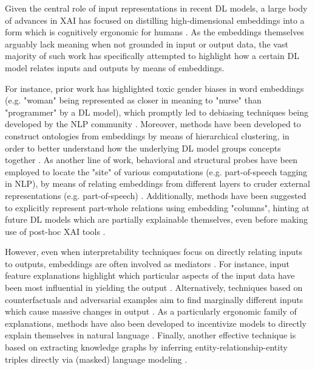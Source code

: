Given the central role of input representations in recent DL models, a large body of advances in XAI has focused on distilling high-dimensional embeddings into a form which is cognitively ergonomic for humans \citep{madsen_post-hoc_2021}. As the embeddings themselves arguably lack meaning when not grounded in input or output data, the vast majority of such work has specifically attempted to highlight how a certain DL model relates inputs and outputs by means of embeddings.

For instance, prior work has highlighted toxic gender biases in word embeddings (e.g. "woman" being represented as closer in meaning to "nurse" than "programmer" by a DL model), which promptly led to debiasing techniques being developed by the NLP community \citep{bolukbasi_man_2016}. Moreover, methods have been developed to construct ontologies from embeddings by means of hierarchical clustering, in order to better understand how the underlying DL model groups concepts together \citep{liu_interpretation_2018}. As another line of work, behavioral and structural probes have been employed to locate the "site" of various computations (e.g. part-of-speech tagging in NLP), by means of relating embeddings from different layers to cruder external representations (e.g. part-of-speech) \citep{tenney_bert_2019}. Additionally, methods have been suggested to explicitly represent part-whole relations using embedding "columns", hinting at future DL models which are partially explainable themselves, even before making use of post-hoc XAI tools \citep{hinton_how_2021}.

However, even when interpretability techniques focus on directly relating inputs to outputs, embeddings are often involved as mediators \citep{danilevsky_survey_nodate}. For instance, input feature explanations highlight which particular aspects of the input data have been most influential in yielding the output \citep{jain_attention_nodate}. Alternatively, techniques based on counterfactuals and adversarial examples aim to find marginally different inputs which cause massive changes in output \citep{madsen_post-hoc_2021}. As a particularly ergonomic family of explanations, methods have also been developed to incentivize models to directly explain themselves in natural language \citep{madsen_post-hoc_2021}. Finally, another effective technique is based on extracting knowledge graphs by inferring entity-relationship-entity triples directly via (masked) language modeling \citep{wang_language_2020}.

